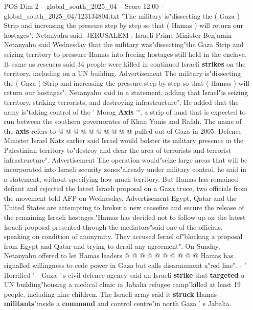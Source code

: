 \begin{textsample}{POS Dim 2 – global\_south\_2025\_04 – Score 12.00 – global\_south\_2025\_04/123134804.txt}  \label{ex:f2_pos_347}
"The military is"dissecting the ( Gaza ) Strip and increasing the pressure step by step so that ( Hamas ) will return our hostages", Netanyahu said.
JERUSALEM : Israeli Prime Minister Benjamin Netanyahu said Wednesday that the military was"dissecting"the Gaza Strip and seizing territory to pressure Hamas into freeing hostages still held in the enclave.
It came as rescuers said 34 people were killed in continued Israeli \textbf{strikes} on the territory, including on a UN building.
Advertisement The military is"dissecting the ( Gaza ) Strip and increasing the pressure step by step so that ( Hamas ) will return our hostages", Netanyahu said in a statement, adding that Israel"is seizing territory, striking terrorists, and destroying infrastructure".
He added that the army is"taking control of the ' Morag \textbf{Axis} '", a strip of land that is expected to run between the southern governorates of Khan Yunis and Rafah.
The name of the \textbf{axis} refers to @ @ @ @ @ @ @ @ @ @ pulled out of Gaza in 2005.
Defence Minister Israel Katz earlier said Israel would bolster its military presence in the Palestinian territory to"destroy and clear the area of terrorists and terrorist infrastructure".
Advertisement The operation would"seize large areas that will be incorporated into Israeli security zones"already under military control, he said in a statement, without specifying how much territory.
But Hamas has remained defiant and rejected the latest Israeli proposal on a Gaza truce, two officials from the movement told AFP on Wednesday.
Advertisement Egypt, Qatar and the United States are attempting to broker a new ceasefire and secure the release of the remaining Israeli hostages."Hamas has decided not to follow up on the latest Israeli proposal presented through the mediators"said one of the officials, speaking on condition of anonymity.
They accused Israel of"blocking a proposal from Egypt and Qatar and trying to derail any agreement".
On Sunday, Netanyahu offered to let Hamas leaders @ @ @ @ @ @ @ @ @ @ Hamas has signalled willingness to cede power in Gaza but calls disarmament a"red line". - ' Horrified ' - Gaza ' s civil defence agency said an Israeli \textbf{strike} that \textbf{targeted} a UN building"housing a medical clinic in Jabalia refugee camp"killed at least 19 people, including nine children.
The Israeli army said it \textbf{struck} Hamas \textbf{militants}"inside a \textbf{command} and control centre"in north Gaza ' s Jabalia.

\end{textsample}

